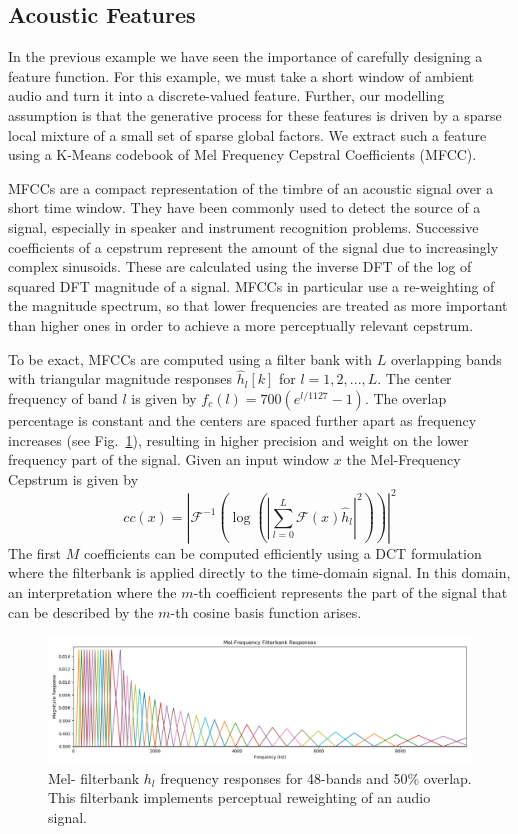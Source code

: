 \subsection{Acoustic Features}
In the previous example we have seen the importance of carefully designing a feature function. For this example, we must take a short window of ambient audio and turn it into a discrete-valued feature. Further, our modelling assumption is that the generative process for these features is driven by a sparse local mixture of a small set of sparse global factors. We extract such a feature using a K-Means codebook of Mel Frequency Cepstral Coefficients (MFCC).

MFCCs are a compact representation of the timbre of an acoustic signal over a short time window. They have been commonly used to detect the source of a signal, especially in speaker and instrument recognition problems. Successive coefficients of a cepstrum represent the amount of the signal due to increasingly complex sinusoids. These are calculated using the inverse DFT of the log of squared DFT magnitude of a signal. MFCCs in particular use a re-weighting of the magnitude spectrum, so that lower frequencies are treated as more important than higher ones in order to achieve a more perceptually relevant cepstrum.

To be exact, MFCCs are computed using a filter bank with $L$ overlapping bands with triangular magnitude responses $\hat{h}_{l}[k]$ for $l=1, 2, ..., L$. The center frequency of band $l$ is given by $f_c(l) = 700 (e^{l/1127} - 1)$. The overlap percentage is constant and the centers are spaced further apart as frequency increases (see Fig.~\ref{fig:audio-melbank}), resulting in higher precision and weight on the lower frequency part of the signal. Given an input window $x$ the Mel-Frequency Cepstrum is given by
\begin{equation}
    cc(x) = \left| \mathcal{F}^{-1} \left( \log\left( \left|
    \sum_{l=0}^L
    \mathcal{F} \left(x\right) \hat{h}_l
    \right|^2 \right) \right) \right|^2
\end{equation}
The first $M$ coefficients can be computed efficiently using a DCT formulation where the filterbank is applied directly to the time-domain signal. In this domain, an interpretation where the $m$-th coefficient represents the part of the signal that can be described by the $m$-th cosine basis function arises.

\begin{figure}
    \centering
    \includegraphics[width=\textwidth]{figures/audio/mel-responses.png}
    \caption{Mel- filterbank $h_l$ frequency responses for 48-bands and 50\% overlap. This filterbank implements perceptual reweighting of an audio signal.}
    \label{fig:audio-melbank}
\end{figure}

